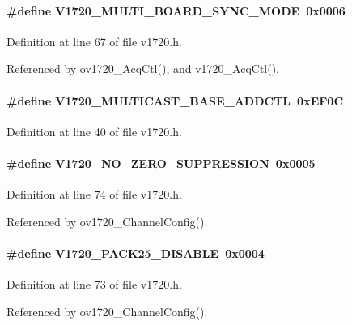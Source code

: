 \paragraph[{V1720\_\-MULTI\_\-BOARD\_\-SYNC\_\-MODE}]{\setlength{\rightskip}{0pt plus 5cm}\#define V1720\_\-MULTI\_\-BOARD\_\-SYNC\_\-MODE~0x0006}\hfill\label{v1720_8h_abab1dbfedf343a71014d527d77bfd9c9}


Definition at line 67 of file v1720.h.

Referenced by ov1720\_\-AcqCtl(), and v1720\_\-AcqCtl().
\paragraph[{V1720\_\-MULTICAST\_\-BASE\_\-ADDCTL}]{\setlength{\rightskip}{0pt plus 5cm}\#define V1720\_\-MULTICAST\_\-BASE\_\-ADDCTL~0xEF0C}\hfill\label{v1720_8h_a099a2e02705af6923903a00f0fbe1d69}


Definition at line 40 of file v1720.h.
\paragraph[{V1720\_\-NO\_\-ZERO\_\-SUPPRESSION}]{\setlength{\rightskip}{0pt plus 5cm}\#define V1720\_\-NO\_\-ZERO\_\-SUPPRESSION~0x0005}\hfill\label{v1720_8h_a6d132539c7774537c7260d2e8b82bf89}


Definition at line 74 of file v1720.h.

Referenced by ov1720\_\-ChannelConfig().
\paragraph[{V1720\_\-PACK25\_\-DISABLE}]{\setlength{\rightskip}{0pt plus 5cm}\#define V1720\_\-PACK25\_\-DISABLE~0x0004}\hfill\label{v1720_8h_a5372f65f53a17e89f63d728922d41c53}


Definition at line 73 of file v1720.h.

Referenced by ov1720\_\-ChannelConfig().
